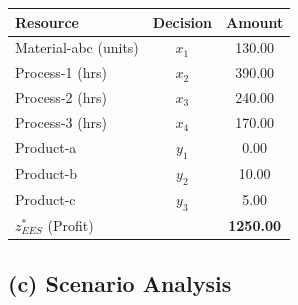 \documentclass[7pt]{article}
\begin{document}
\hfill
\begin{minipage}[t]{0.4\textwidth}
    \vspace{12em}
    \centering
    \small
    \begin{tabular}{l|c|c}
        \toprule
        \textbf{Resource}    & \textbf{Decision} & \textbf{Amount}  \\
        \midrule
        Material-abc (units) & $x_1$             & 130.00           \\
        Process-1 (hrs)      & $x_2$             & 390.00           \\
        Process-2 (hrs)      & $x_3$             & 240.00           \\
        Process-3 (hrs)      & $x_4$             & 170.00           \\
        Product-a            & $y_1$             & 0.00             \\
        Product-b            & $y_2$             & 10.00            \\
        Product-c            & $y_3$             & 5.00             \\
        \midrule
        $z_{EES}^*$ (Profit) &                   & \textbf{1250.00} \\
        \bottomrule
    \end{tabular}
\end{minipage}

\newpage

\subsection*{(c) Scenario Analysis}
\end{document}
